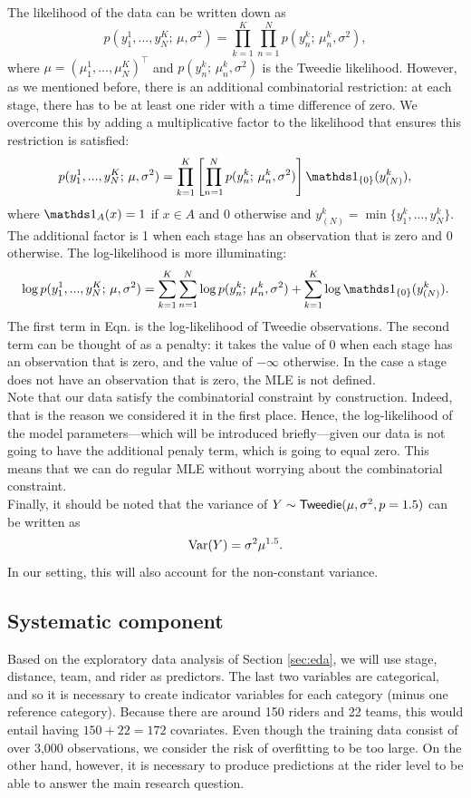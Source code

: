 \documentclass[aos,preprint]{imsart}
\begin{document}
The likelihood of the data can be written down as
\[
  p(y_1^1, ..., y_N^K; \, \mu, \sigma^2) = \prod_{k=1}^K \prod_{n=1}^N p(y_n^k; \, \mu_n^k, \sigma^2),
\]
where $\mu = (\mu_1^1, ..., \mu_N^K)^\top$ and $p(y_n^k; \, \mu_n^k, \sigma^2)$ is the Tweedie likelihood. However, as we mentioned before, there is an additional combinatorial restriction: at each stage, there has to be at least one rider with a time difference of zero. We overcome this by adding a multiplicative factor to the likelihood that ensures this restriction is satisfied:
\[
  p(y_1^1, ..., y_N^K; \, \mu, \sigma^2) = \prod_{k=1}^K \left[ \prod_{n=1}^N p(y_n^k; \, \mu_n^k, \sigma^2) \right] \ind_{\{ 0\}} (y_{(N)}^k),
\]
where $\ind_A(x) = 1$ if $x \in A$ and 0 otherwise and $y_{(N)}^k = \min \{y_1^k, ..., y_N^k \}$. The additional factor is 1 when each stage has an observation that is zero and 0 otherwise. The log-likelihood is more illuminating:
\[
  \log p(y_1^1, ..., y_N^K; \, \mu, \sigma^2) = \sum_{k=1}^K \sum_{n=1}^N \log p(y_n^k; \, \mu_n^k, \sigma^2) + \sum_{k=1}^K \log \ind_{\{ 0\}} (y_{(N)}^k). \label{eq:loglike}
\]
The first term in Eqn.  is the log-likelihood of \iid Tweedie observations. The second term can be thought of as a penalty: it takes the value of 0 when each stage has an observation that is zero, and the value of $-\infty$ otherwise. In the case a stage does not have an observation that is zero, the MLE is not defined. \\


Note that our data satisfy the combinatorial constraint by construction. Indeed, that is the reason we considered it in the first place. Hence, the log-likelihood of the model parameters---which will be introduced briefly---given our data is not going to have the additional penaly term, which is going to equal zero. This means that we can do regular MLE without worrying about the combinatorial constraint. \\


Finally, it should be noted that the variance of $Y \sim {\sf{Tweedie}}(\mu, \sigma^2, p = 1.5)$ can be written as
\[
  \operatorname{Var} (Y) = \sigma^2 \mu^{1.5}.
\]
In our setting, this will also account for the non-constant variance.


\subsection{Systematic component}


Based on the exploratory data analysis of Section \ref{sec:eda}, we will use stage, distance, team, and rider as predictors. The last two variables are categorical, and so it is necessary to create indicator variables for each category (minus one reference category). Because there are around 150 riders and 22 teams, this would entail having $150+22 = 172$ covariates. Even though the training data consist of over 3,000 observations, we consider the risk of overfitting to be too large. On the other hand, however, it is necessary to produce predictions at the rider level to be able to answer the main research question. \\
\end{document}
